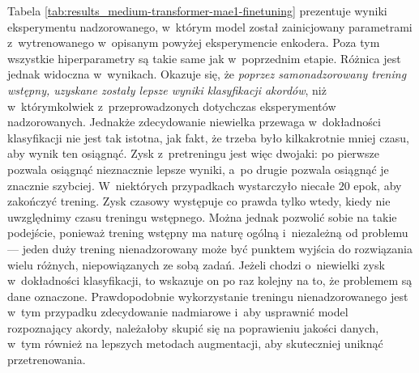 Tabela \ref{tab:results_medium-transformer-mae1-finetuning} prezentuje wyniki eksperymentu nadzorowanego, w~którym model został zainicjowany parametrami z~wytrenowanego w~opisanym powyżej eksperymencie enkodera. Poza tym wszystkie hiperparametry są takie same jak w~poprzednim etapie. Różnica jest jednak widoczna w~wynikach. Okazuje się, że \emph{poprzez samonadzorowany trening wstępny, uzyskane zostały lepsze wyniki klasyfikacji akordów}, niż w~którymkolwiek z~przeprowadzonych dotychczas eksperymentów nadzorowanych. Jednakże zdecydowanie niewielka przewaga w~dokładności klasyfikacji nie jest tak istotna, jak fakt, że trzeba było kilkakrotnie mniej czasu, aby wynik ten osiągnąć. Zysk z~pretreningu jest więc dwojaki: po pierwsze pozwala osiągnąć nieznacznie lepsze wyniki, a~po drugie pozwala osiągnąć je znacznie szybciej. W~niektórych przypadkach wystarczyło niecałe $20$ epok, aby zakończyć trening. Zysk czasowy występuje co prawda tylko wtedy, kiedy nie uwzględnimy czasu treningu wstępnego. Można jednak pozwolić sobie na takie podejście, ponieważ trening wstępny ma naturę ogólną i~niezależną od problemu --- jeden duży trening nienadzorowany może być punktem wyjścia do rozwiązania wielu różnych, niepowiązanych ze sobą zadań. Jeżeli chodzi o~niewielki zysk w~dokładności klasyfikacji, to wskazuje on po raz kolejny na to, że problemem są dane oznaczone. Prawdopodobnie wykorzystanie treningu nienadzorowanego jest w~tym przypadku zdecydowanie nadmiarowe i~aby usprawnić model rozpoznający akordy, należałoby skupić się na poprawieniu jakości danych, w~tym również na lepszych metodach augmentacji, aby skuteczniej uniknąć przetrenowania.


